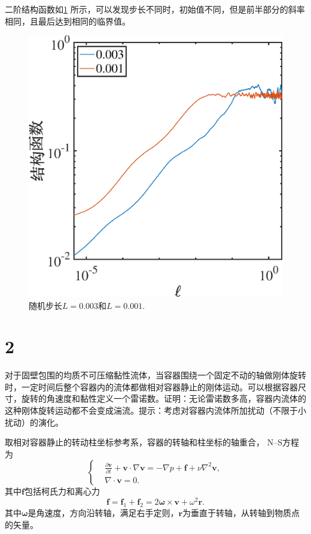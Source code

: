 \documentclass[12pt]{ctexart}
\begin{document}
二阶结构函数如\cref{fig:1ell1} 所示，可以发现步长不同时，初始值不同，但是前半部分的斜率相同，且最后达到相同的临界值。
\begin{figure}[htp]
	\centering
	\includegraphics[scale=0.33]{L1e-3L}
	\caption{随机步长$L=0.003$和$L=0.001$.}
	\label{fig:1ell1}
\end{figure}


\section{2}

对于固壁包围的均质不可压缩黏性流体，当容器围绕一个固定不动的轴做刚体旋转时，一定时间后整个容器内的流体都做相对容器静止的刚体运动。可以根据容器尺寸，旋转的角速度和黏性定义一个雷诺数。证明：无论雷诺数多高，容器内流体的这种刚体旋转运动都不会变成湍流。提示：考虑对容器内流体所加扰动（不限于小扰动）的演化。



取相对容器静止的转动柱坐标参考系，容器的转轴和柱坐标的轴重合， N--S方程为
\begin{equation}
	\left\{
	\begin{aligned}
		 & \frac{\partial \bm{v}}{\partial t}+ \bm{v} \cdot \nabla \bm{v} = -\nabla p + \bm{f} + \nu \nabla^2 \bm{v}, \\
		 & \nabla \cdot \bm{v} = 0.
	\end{aligned}
	\right.
\end{equation}
其中$\bm{f}$包括柯氏力和离心力
\begin{equation}
	\bm{f} = \bm{f}_1 + \bm{f}_2 = 2 \bm{\omega} \times \bm{v} + \omega^2\bm{r}.
\end{equation}
其中$\bm{\omega}$是角速度，方向沿转轴，满足右手定则，$\bm{r}$为垂直于转轴，从转轴到物质点的矢量。
\end{document}
